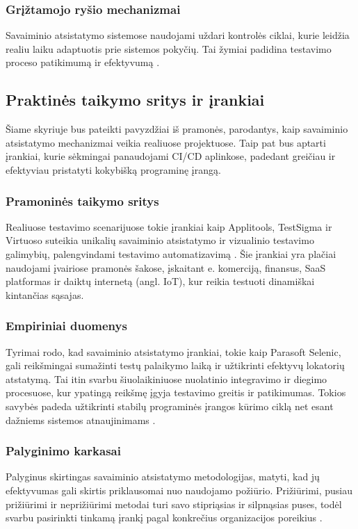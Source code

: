 \documentclass[
]{VUMIFPSkursinis}
\begin{document}
\subsubsection{Grįžtamojo ryšio mechanizmai}
Savaiminio atsistatymo sistemose naudojami uždari kontrolės ciklai, kurie leidžia realiu laiku adaptuotis prie sistemos pokyčių. Tai žymiai padidina testavimo proceso patikimumą ir efektyvumą \cite[1]{Schneider2013}.

\subsection{Praktinės taikymo sritys ir įrankiai}

Šiame skyriuje bus pateikti pavyzdžiai iš pramonės, parodantys, kaip savaiminio atsistatymo mechanizmai veikia realiuose projektuose. Taip pat bus aptarti įrankiai, kurie sėkmingai panaudojami CI/CD aplinkose, padedant greičiau ir efektyviau pristatyti kokybišką programinę įrangą.

\subsubsection{Pramoninės taikymo sritys}
Realiuose testavimo scenarijuose tokie įrankiai kaip Applitools, TestSigma ir Virtuoso suteikia unikalių savaiminio atsistatymo ir vizualinio testavimo galimybių, palengvindami testavimo automatizavimą \cite[4]{Garousi2024}. Šie įrankiai yra plačiai naudojami įvairiose pramonės šakose, įskaitant e. komerciją, finansus, SaaS platformas ir daiktų internetą (angl. IoT), kur reikia testuoti dinamiškai kintančias sąsajas.
\subsubsection{Empiriniai duomenys}
Tyrimai rodo, kad savaiminio atsistatymo įrankiai, tokie kaip Parasoft Selenic, gali reikšmingai sumažinti testų palaikymo laiką ir užtikrinti efektyvų lokatorių atstatymą. Tai itin svarbu šiuolaikiniuose nuolatinio integravimo ir diegimo procesuose, kur ypatingą reikšmę įgyja testavimo greitis ir patikimumas. Tokios savybės padeda užtikrinti stabilų programinės įrangos kūrimo ciklą net esant dažniems sistemos atnaujinimams \cite[7]{Garousi2024}.
\subsubsection{Palyginimo karkasai}
Palyginus skirtingas savaiminio atsistatymo metodologijas, matyti, kad jų efektyvumas gali skirtis priklausomai nuo naudojamo požiūrio. Prižiūrimi, pusiau prižiūrimi ir neprižiūrimi metodai turi savo stipriąsias ir silpnąsias puses, todėl svarbu pasirinkti tinkamą įrankį pagal konkrečius organizacijos poreikius \cite[22]{Schneider2013}.
\end{document}
